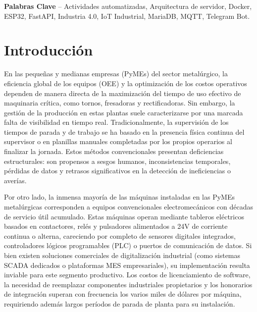 \documentclass[11pt,a4paper]{article}
\begin{document}
\vspace{0.2cm}
\noindent \textbf{Palabras Clave} -- Actividades automatizadas, Arquitectura de servidor, Docker, ESP32, FastAPI, Industria 4.0, IoT Industrial, MariaDB, MQTT, Telegram Bot.

\vspace{0.5cm}

\section{Introducción}

En las pequeñas y medianas empresas (PyMEs) del sector metalúrgico, la eficiencia global de los equipos (OEE) y la optimización de los costos operativos dependen de manera directa de la maximización del tiempo de uso efectivo de maquinaria crítica, como tornos, fresadoras y rectificadoras. Sin embargo, la gestión de la producción en estas plantas suele caracterizarse por una marcada falta de visibilidad en tiempo real. Tradicionalmente, la supervisión de los tiempos de parada y de trabajo se ha basado en la presencia física continua del supervisor o en planillas manuales completadas por los propios operarios al finalizar la jornada. Estos métodos convencionales presentan deficiencias estructurales: son propensos a sesgos humanos, inconsistencias temporales, pérdidas de datos y retrasos significativos en la detección de ineficiencias o averías.

Por otro lado, la inmensa mayoría de las máquinas instaladas en las PyMEs metalúrgicas corresponden a equipos convencionales electromecánicos con décadas de servicio útil acumulado. Estas máquinas operan mediante tableros eléctricos basados en contactores, relés y pulsadores alimentados a 24V de corriente continua o alterna, careciendo por completo de sensores digitales integrados, controladores lógicos programables (PLC) o puertos de comunicación de datos. Si bien existen soluciones comerciales de digitalización industrial (como sistemas SCADA dedicados o plataformas MES empresariales), su implementación resulta inviable para este segmento productivo. Los costos de licenciamiento de software, la necesidad de reemplazar componentes industriales propietarios y los honorarios de integración superan con frecuencia los varios miles de dólares por máquina, requiriendo además largos períodos de parada de planta para su instalación.
\end{document}
